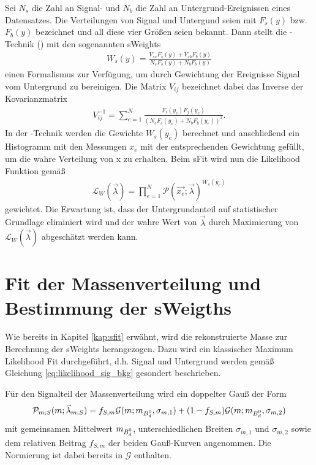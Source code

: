 Sei $N_s$ die Zahl an Signal- und $N_b$ die Zahl an Untergrund-Ereignissen eines Datensatzes. Die Verteilungen von Signal und Untergund seien mit $F_s(y)$ bzw. $F_b(y)$ bezeichnet und all diese vier Größen seien bekannt. Dann stellt die \SPlot-Technik (\cite{splot}) mit den sogenannten \glqq sWeights\grqq 
\begin{align}
W_s(y) = \frac{V_{ss}F_s(y)+V_{sb}F_b(y)}{N_sF_s(y)+N_bF_b(y)}
\end{align} 
einen Formalismus zur Verfügung, um durch Gewichtung der Ereignisse Signal vom Untergrund zu bereinigen. Die Matrix $V_{ij}$ bezeichnet dabei das Inverse der Kovarianzmatrix
\begin{align}
V_{ij}^{-1} = \sum_{e=1}^N \frac{F_i(y_e)F_j(y_e)}{(N_sF_s(y_e)+N_bF_b(y_e))^2}.
\end{align}
In der \SPlot-Technik werden die Gewichte $W_s(y_e)$ berechnet und anschließend ein Histogramm mit den Messungen $x_e$ mit der entsprechenden Gewichtung gefüllt, um die wahre Verteilung von x zu erhalten. Beim sFit wird nun die Likelihood Funktion gemäß
\begin{align}
\mathcal{L}_W(\vec{\lambda}) = \prod_{e=1}^N \mathcal{P}(\vec{x_e};\vec{\lambda})^{W_s(y_e)}
\end{align}
gewichtet. Die Erwartung ist, dass der Untergrundanteil auf statistischer Grundlage eliminiert wird und der wahre Wert von $\vec{\lambda}$ durch Maximierung von $\mathcal{L}_W(\vec{\lambda})$ abgeschätzt werden kann. \cite{sfit}

\section{Fit der Massenverteilung und Bestimmung der sWeigths} \label{kap:massenfit}
Wie bereits in Kapitel \ref{kap:sfit} erwähnt, wird die rekonstruierte Masse zur Berechnung der sWeights herangezogen. Dazu wird ein klassischer Maximum Likelihood Fit durchgeführt, d.h. Signal und Untergrund werden gemäß Gleichung \ref{eq:likelihood_sig_bkg} gesondert beschrieben.

Für den Signalteil der Massenverteilung wird ein doppelter Gauß der Form
\begin{align}
\mathcal{P}_{m;S}(m;\vec{\lambda}_{m;S}) = f_{S,m}\mathcal{G}(m;m_{\text{$B_d^0$}},\sigma_{m,1}) + (1-f_{S,m})\mathcal{G}(m;m_{\text{$B_d^0$}},\sigma_{m,2})
\end{align}
mit gemeinsamen Mittelwert $m_{\text{$B_d^0$}}$, unterschiedlichen Breiten $\sigma_{m,1}$ und $\sigma_{m,2}$ sowie dem relativen Beitrag $f_{S,m}$ der beiden Gauß-Kurven angenommen. Die Normierung ist dabei bereits in $\mathcal{G}$ enthalten.

